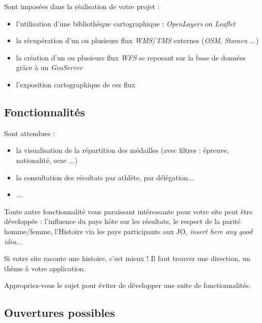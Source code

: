 \documentclass{article}
\begin{document}
Sont imposées dans la réalisation de votre projet :

\begin{itemize}

\item l'utilisation d'une bibliothèque cartographique : \textit{OpenLayers} ou \textit{Leaflet}

\item la récupération d'un ou plusieurs flux \textit{WMS}/\textit{TMS} externes (\textit{OSM}, \textit{Stamen} ...)

\item la création d'un ou plusieurs flux \textit{WFS} se reposant sur la base de données grâce à un \textit{GeoServer}

\item l'exposition cartographique de ces flux 

\end{itemize}

\newpage

\subsection{Fonctionnalités}

Sont attendues :
\begin{itemize}

\item la visualisation de la répartition des médailles (avec filtres : épreuve, nationalité, sexe ...)

\item la consultation des résultats par athlète, par délégation...

\item ...

\end{itemize}

Toute autre fonctionnalité vous paraissant intéressante pour votre site peut être développée : l'influence du pays hôte sur les résultats, le respect de la parité homme/femme, l'Histoire via les pays participants aux JO, \textit{insert here any good idea}...

Si votre site raconte une histoire, c'est mieux ! Il faut trouver une direction, un thème à votre application. 

Appropriez-vous le sujet pour éviter de développer une suite de fonctionnalités.

\subsection{Ouvertures possibles}
\end{document}
